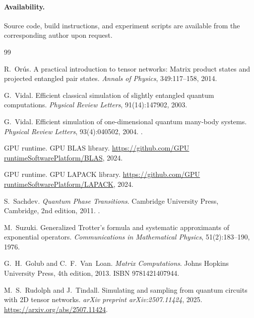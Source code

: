 \documentclass[11pt]{article}
\begin{document}
\paragraph{Availability.}
Source code, build instructions, and experiment scripts are available from
the corresponding author upon request.


\begin{thebibliography}{99}

R.~Or\'us.
\newblock A practical introduction to tensor networks: Matrix product states
 and projected entangled pair states.
\newblock \emph{Annals of Physics}, 349:117--158, 2014.

G.~Vidal.
\newblock Efficient classical simulation of slightly entangled quantum
 computations.
\newblock \emph{Physical Review Letters}, 91(14):147902, 2003.

G.~Vidal.
\newblock Efficient simulation of one-dimensional quantum many-body systems.
\newblock \emph{Physical Review Letters}, 93(4):040502, 2004.
\newblock {}.

{GPU runtime}.
\newblock GPU BLAS library.
\newblock \url{https://github.com/GPU runtimeSoftwarePlatform/BLAS}, 2024.

{GPU runtime}.
\newblock GPU LAPACK library.
\newblock \url{https://github.com/GPU runtimeSoftwarePlatform/LAPACK}, 2024.

S.~Sachdev.
\newblock \emph{Quantum Phase Transitions}.
\newblock Cambridge University Press, Cambridge, 2nd edition, 2011.
\newblock {}.

M.~Suzuki.
\newblock Generalized {Trotter}'s formula and systematic approximants of
 exponential operators.
\newblock \emph{Communications in Mathematical Physics}, 51(2):183--190, 1976.

G.~H.~Golub and C.~F.~Van~Loan.
\newblock \emph{Matrix Computations}.
\newblock Johns Hopkins University Press, 4th edition, 2013.
\newblock ISBN 9781421407944.

M.~S.~Rudolph and J.~Tindall.
\newblock Simulating and sampling from quantum circuits with {2D} tensor
 networks.
\newblock \emph{arXiv preprint arXiv:2507.11424}, 2025.
\newblock \url{https://arxiv.org/abs/2507.11424}.


\end{thebibliography}
\end{document}
